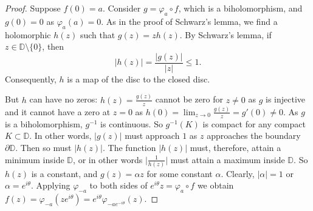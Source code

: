 \documentclass[12pt,openany]{book}
\newcommand{\sabs}[1]{\lvert {#1} \rvert}
\newcommand{\babs}[1]{\bigl\lvert {#1} \bigr\rvert}
\newcommand{\D}{{\mathbb{D}}}
\theoremstyle{plain}
\theoremstyle{remark}
\theoremstyle{definition}
\theoremstyle{exercise}
\theoremstyle{example}
\begin{document}
\begin{proof}
Suppose $f(0) = a$.
Consider $g = \varphi_a \circ f$, which is a biholomorphism,
and $g(0) = 0$ as
$\varphi_a(a) = 0$.
As in the proof of Schwarz's lemma, we find a holomorphic $h(z)$
such that $g(z) = z h(z)$.  By
Schwarz's lemma, if $z \in \D \setminus \{ 0 \}$, then
\begin{equation*}
\sabs{h(z)} = \frac{\sabs{g(z)}}{\sabs{z}} \leq 1 .
\end{equation*}
Consequently, $h$ is a map of the disc to the closed disc.

But $h$ can have no zeros:
$h(z) = \frac{g(z)}{z}$ cannot be zero for $z \not= 0$ as $g$ is injective
and it cannot have a zero at $z=0$
as $h(0) = \lim_{z\to 0} \frac{g(z)}{z} = g'(0) \not= 0$.  As $g$ is a biholomorphism, $g^{-1}$ is
continuous. So $g^{-1}(K)$ is compact for any compact $K \subset \D$.
In other words, $\sabs{g(z)}$ must approach $1$ as $z$
approaches the boundary $\partial \D$.
Then so must $\sabs{h(z)}$.
The function
$\sabs{h(z)}$ must, therefore, attain a minimum inside $\D$, or in other
words $\babs{\frac{1}{h(z)}}$ must attain a maximum inside $\D$.  So $h(z)$
is a constant, and $g(z) = \alpha z$ for some constant $\alpha$.
Clearly, 
$\sabs{\alpha} = 1$ or $\alpha = e^{i\theta}$.  Applying
$\varphi_{-a}$ to both sides of $e^{i\theta} z = \varphi_a \circ f$
we obtain
$f(z) = \varphi_{-a}(ze^{i\theta})
= e^{i \theta} \varphi_{-ae^{-i\theta}}(z)$.
\end{proof}
\end{document}
